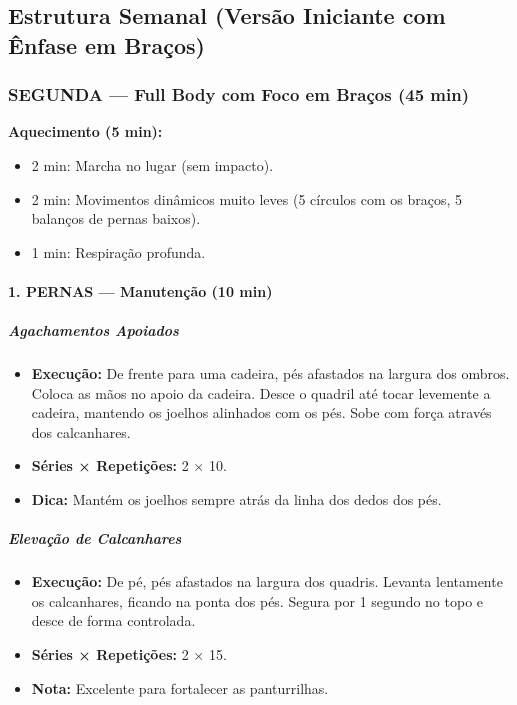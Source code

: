 \documentclass[12pt,a4paper]{scrartcl}
\begin{document}
\subsection{Estrutura Semanal (Versão Iniciante com Ênfase em Braços)}
\subsubsection{SEGUNDA — Full Body com Foco em Braços (45 min)}
\textbf{Aquecimento (5 min):}
\begin{itemize}
    \item 2 min: Marcha no lugar (sem impacto).
    \item 2 min: Movimentos dinâmicos muito leves (5 círculos com os braços, 5 balanços de pernas baixos).
    \item 1 min: Respiração profunda.
\end{itemize}

\paragraph{1. PERNAS — Manutenção (10 min)}
\subparagraph{Agachamentos Apoiados}
\begin{itemize}
    \item \textbf{Execução:} De frente para uma cadeira, pés afastados na largura dos ombros. Coloca as mãos no apoio da cadeira. Desce o quadril até tocar levemente a cadeira, mantendo os joelhos alinhados com os pés. Sobe com força através dos calcanhares.
    \item \textbf{Séries × Repetições:} 2 × 10.
    \item \textbf{Dica:} Mantém os joelhos sempre atrás da linha dos dedos dos pés.
\end{itemize}
\begin{center}
\end{center}

\subparagraph{Elevação de Calcanhares}
\begin{itemize}
    \item \textbf{Execução:} De pé, pés afastados na largura dos quadris. Levanta lentamente os calcanhares, ficando na ponta dos pés. Segura por 1 segundo no topo e desce de forma controlada.
    \item \textbf{Séries × Repetições:} 2 × 15.
    \item \textbf{Nota:} Excelente para fortalecer as panturrilhas.
\end{itemize}
\begin{center}
\end{center}
\end{document}
